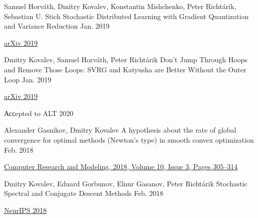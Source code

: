 \begin{cventries}
\cventry
{Samuel Horváth, Dmitry Kovalev, Konstantin Mishchenko, Peter Richtárik, Sebastian U. Stich} %
{Stochastic Distributed Learning with Gradient Quantization and Variance Reduction} %
{} %
{Jan. 2019} %
{ %
	\begin{cvitems}
		\item {\href{https://arxiv.org/abs/1904.05115}{arXiv 2019}}
	\end{cvitems}
}

\cventry
{Dmitry Kovalev, Samuel Horváth, Peter Richtárik} %
{Don't Jump Through Hoops and Remove Those Loops: SVRG and Katyusha are Better Without the Outer Loop} %
{} %
{Jan. 2019} %
{ %
	\begin{cvitems}
		\item {\href{https://arxiv.org/abs/1901.08689}{arXiv 2019}}
		\item Ассepted to ALT 2020
	\end{cvitems}
}


\cventry
{Alexander Gasnikov, Dmitry Kovalev	} %
{A hypothesis about the rate of global convergence for optimal methods (Newton's type) in smooth convex optimization } %
{} %
{Feb. 2018} %
{ %
	\begin{cvitems}
		\item {\href{http://www.mathnet.ru/php/archive.phtml?wshow=paper\&jrnid=crm\&paperid=253\&option\_lang=eng}{
				Computer Research and Modeling, 2018,	Volume 10,	Issue 3,	Pages 305–314}}
	\end{cvitems}
}


\cventry
{Dmitry Kovalev, Eduard Gorbunov, Elnur Gasanov, Peter Richtárik} %
{Stochastic Spectral and Conjugate Descent Methods} %
{} %
{Feb. 2018} %
{ %
\begin{cvitems}
\item {\href{https://papers.nips.cc/paper/7596-stochastic-spectral-and-conjugate-descent-methods}{NeurIPS 2018}}
\end{cvitems}
}



\end{cventries}
